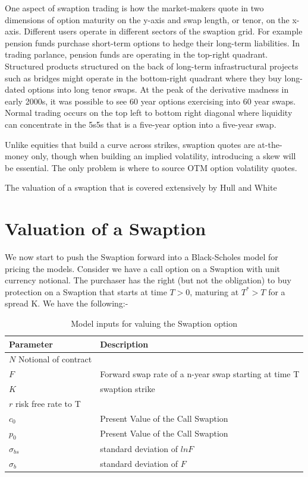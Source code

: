 \documentclass[11pt]{article}
\begin{document}
One aspect of swaption trading is how the market-makers quote in two dimensions of option maturity on the y-axis and swap length, or tenor, on the x-axis.  Different users operate in different sectors of the swaption grid.  For example pension funds purchase short-term options to hedge their long-term liabilities.  In trading parlance, pension funds are operating in the top-right quadrant.  Structured products structured on the back of long-term infrastructural  projects such as bridges might operate in the bottom-right quadrant where they buy long-dated options into long tenor swaps.  At the peak of the derivative madness in early 2000s, it was possible to see 60 year options exercising into 60 year swaps.  Normal trading occurs on the top left to bottom right diagonal where liquidity can concentrate in the 5s5s that is a five-year option into a five-year swap. \par

Unlike equities that build a curve across strikes, swaption quotes are at-the-money only, though when building an implied volatility, introducing a skew will be essential.  The only problem is where to source OTM option volatility quotes. \par

The valuation of a swaption that is covered extensively by Hull and White\cite{art_hull_white_2003} \par

\section{Valuation of a Swaption}
We now start to push the Swaption forward into a Black-Scholes model for pricing the models.  Consider we have a call option on a Swaption with unit currency notional.  The purchaser has the right (but not the obligation) to buy protection on a Swaption that starts at time $T>0$, maturing at $T^*>T$ for a spread K.  We have the following:- \par

\begin{table}[ht]
	\centering
	\begin{tabular}{ll}
		Parameter & Description\\
		\toprule[1pt]
		$N$ Notional of contract \\[2ex]
		$F$ & Forward swap rate of a n-year swap starting at time T \\ [2ex]
		$K$ & swaption strike\\ [2ex]
		$r$ risk free rate to T \\[2ex]
		$c_0$ & Present Value of the Call Swaption \\ [2ex]
		$p_0$ & Present Value of the Call Swaption \\ [2ex]
		$\sigma_{bs}$ & standard deviation of $ln F$ \\ [2ex]
		$\sigma_{b}$ & standard deviation of $ F$ \\ [2ex] 
		\bottomrule[1pt]
	\end{tabular}
	\caption{Model inputs for valuing the Swaption option }
	\label{tab:model_inputs_Swaption}
\end{table}
\end{document}
